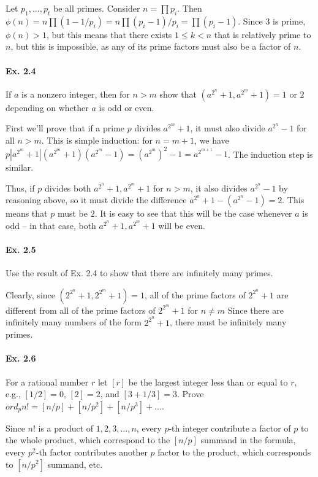 \documentclass[notitlepage]{article}
\theoremstyle{definition}
\begin{document}
Let $p_1, \ldots, p_t$ be all primes. Consider $n = \prod p_i$. Then
$\phi(n) = n\prod(1-1/p_i) = n \prod(p_i - 1)/p_i = \prod(p_i -
1)$. Since 3 is prime, $\phi(n) > 1$, but this means that there exists
$1 \leq k < n$ that is relatively prime to $n$, but this is
impossible, as any of its prime factors must also be a factor of $n$.

\paragraph{Ex. 2.4}
If $a$ is a nonzero integer, then for $n > m$ show that $(a^{2^n} + 1, a^{2^m} + 1) = 1$ or $2$
depending on whether $a$ is odd or even.

First we'll prove that if a prime $p$ divides $a^{2^m} + 1$, it must
also divide $a^{2^n} -1$ for all $n > m$. This is simple induction:
for $n = m+1$, we have $p|a^{2^m} + 1|(a^{2^m}+1)(a^{2^m}-1) =
(a^{2^m})^2 - 1 = a^{2^{m+1}} - 1$. The induction step is similar.

Thus, if $p$ divides both $a^{2^n} + 1, a^{2^m} + 1$ for $n > m$, it
also divides $a^{2^n} - 1$ by reasoning above, so it must divide the
difference $a^{2^n} + 1 - (a^{2^n} - 1) = 2$. This means that $p$ must
be $2$. It is easy to see that this will be the case whenever $a$ is
odd -- in that case, both $a^{2^n} + 1, a^{2^m} + 1$ will be even.

\paragraph{Ex. 2.5}
Use the result of Ex. 2.4 to show that there are infinitely many primes.

Clearly, since $(2^{2^n} + 1, 2^{2^m} + 1) = 1$, all of the prime
factors of $2^{2^n} + 1$ are different from all of the prime factors
of $2^{2^m} + 1$ for $n \ne m$ Since there are infinitely many numbers
of the form $2^{2^n} + 1$, there must be infinitely many primes.

\paragraph{Ex. 2.6}
For a rational number $r$ let $[r]$ be the largest integer less than
or equal to $r$, e.g., $[1/2] = 0$, $[2] = 2$, and $[3+1/3] =
3$. Prove $ord_p n! = [n/p] + [n/p^2] + [n/p^3] + \ldots$.

Since $n!$ is a product of $1, 2, 3, \ldots, n$, every $p$-th integer
contribute a factor of $p$ to the whole product, which correspond to
the $[n/p]$ summand in the formula, every $p^2$-th factor contributes
another $p$ factor to the product, which corresponds to $[n/p^2]$
summand, etc.
\end{document}

